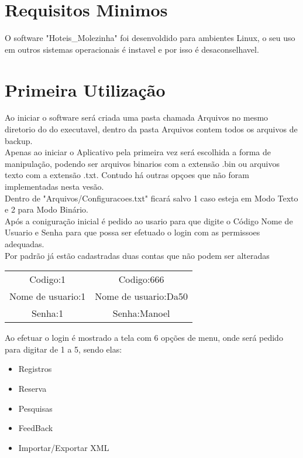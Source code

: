 \documentclass[titlepage]{article}
\begin{document}
	\tableofcontents %


				\section{Requisitos Minimos}
					O software "Hoteis\_Molezinha" foi desenvoldido para ambientes Linux, o seu uso em outros sistemas operacionais é instavel e por isso é desaconselhavel.
				\section{Primeira Utilização}
					Ao iniciar o software será criada uma pasta chamada Arquivos no mesmo diretorio do do executavel, dentro  da pasta Arquivos contem todos os arquivos de backup.\\
					Apenas ao iniciar o Aplicativo pela primeira vez será escolhida a forma de manipulação, podendo ser arquivos binarios com a extensão .bin ou arquivos texto com a extensão .txt. Contudo há outras opçoes que não foram implementadas nesta vesão.\\
					Dentro de "Arquivos/Configuracoes.txt" ficará salvo 1 caso esteja em Modo Texto e 2 para Modo Binário.\\
					Após a coniguração inicial é pedido ao usario para que digite o Código Nome de Usuario e Senha para que possa ser efetuado o login com as permissoes adequadas.\\
					Por padrão já estão cadastradas duas contas que não podem ser alteradas\\

				
					\begin{table}[h]
						\begin{center}
							\begin{tabular}{|c|c|}
								\hline
									Codigo:1&Codigo:666\\
									Nome de usuario:1&Nome de usuario:Da50\\
									Senha:1&Senha:Manoel\\
								\hline
							\end{tabular}
						\end{center}
					\end{table}
				

				Ao efetuar o login é mostrado a tela com 6 opções de menu, onde será pedido para digitar de 1 a 5, sendo elas:

				\begin{itemize}
					\item Registros
					\item Reserva
					\item Pesquisas
					\item FeedBack
					\item Importar/Exportar XML
				\end{itemize}
\end{document}
